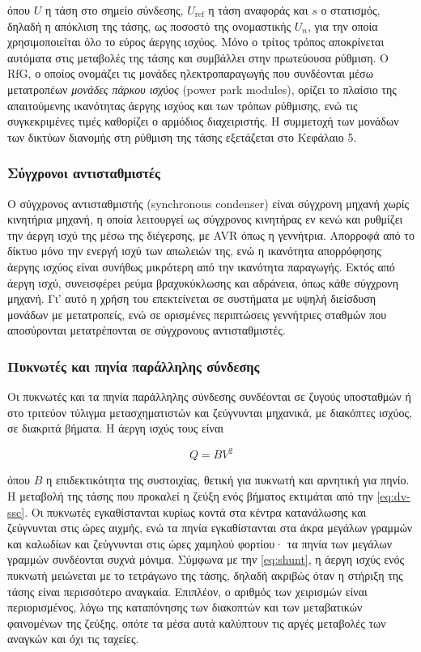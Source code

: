 όπου $U$ η τάση στο σημείο σύνδεσης, $U_{\mathrm{ref}}$ η τάση αναφοράς και $s$ ο στατισμός,
δηλαδή η απόκλιση της τάσης, ως ποσοστό της ονομαστικής $U_n$, για την οποία
χρησιμοποιείται όλο το εύρος άεργης ισχύος. Μόνο ο τρίτος τρόπος αποκρίνεται αυτόματα στις
μεταβολές της τάσης και συμβάλλει στην πρωτεύουσα ρύθμιση. Ο RfG, ο οποίος ονομάζει τις
μονάδες ηλεκτροπαραγωγής που συνδέονται μέσω μετατροπέων \emph{μονάδες πάρκου ισχύος} (power
park modules), ορίζει το πλαίσιο της απαιτούμενης ικανότητας άεργης ισχύος και των τρόπων
ρύθμισης, ενώ τις συγκεκριμένες τιμές καθορίζει ο αρμόδιος διαχειριστής. Η συμμετοχή των μονάδων των δικτύων διανομής στη ρύθμιση
της τάσης εξετάζεται στο Κεφάλαιο 5.

\subsubsection{Σύγχρονοι αντισταθμιστές}

Ο σύγχρονος αντισταθμιστής (synchronous condenser) είναι σύγχρονη μηχανή χωρίς κινητήρια
μηχανή, η οποία λειτουργεί ως σύγχρονος κινητήρας εν κενώ και ρυθμίζει την άεργη ισχύ της
μέσω της διέγερσης, με AVR όπως η γεννήτρια. Απορροφά από το δίκτυο μόνο την ενεργή ισχύ των
απωλειών της, ενώ η ικανότητα απορρόφησης άεργης ισχύος είναι συνήθως μικρότερη από την
ικανότητα παραγωγής. Εκτός από άεργη ισχύ, συνεισφέρει ρεύμα βραχυκύκλωσης και αδράνεια,
όπως κάθε σύγχρονη μηχανή. Γι' αυτό η χρήση του επεκτείνεται σε συστήματα με υψηλή διείσδυση
μονάδων με μετατροπείς, ενώ σε ορισμένες περιπτώσεις γεννήτριες σταθμών που αποσύρονται
μετατρέπονται σε σύγχρονους αντισταθμιστές.

\subsubsection{Πυκνωτές και πηνία παράλληλης σύνδεσης}

Οι πυκνωτές και τα πηνία παράλληλης σύνδεσης συνδέονται σε ζυγούς υποσταθμών ή στο τριτεύον
τύλιγμα μετασχηματιστών και ζεύγνυνται μηχανικά, με διακόπτες ισχύος, σε διακριτά βήματα. Η
άεργη ισχύς τους είναι

\begin{equation}
Q = B V^2
\label{eq:shunt}
\end{equation}

όπου $B$ η επιδεκτικότητα της συστοιχίας, θετική για πυκνωτή και αρνητική για πηνίο. Η
μεταβολή της τάσης που προκαλεί η ζεύξη ενός βήματος εκτιμάται από την \eqref{eq:dv-ssc}. Οι
πυκνωτές εγκαθίστανται κυρίως κοντά στα κέντρα κατανάλωσης και ζεύγνυνται στις ώρες αιχμής,
ενώ τα πηνία εγκαθίστανται στα άκρα μεγάλων γραμμών και καλωδίων και ζεύγνυνται στις ώρες
χαμηλού φορτίου· τα πηνία των μεγάλων γραμμών συνδέονται συχνά μόνιμα. Σύμφωνα με την
\eqref{eq:shunt}, η άεργη ισχύς ενός πυκνωτή μειώνεται με το τετράγωνο της τάσης, δηλαδή
ακριβώς όταν η στήριξη της τάσης είναι περισσότερο αναγκαία. Επιπλέον, ο αριθμός των χειρισμών
είναι περιορισμένος, λόγω της καταπόνησης των διακοπτών και των μεταβατικών φαινομένων της
ζεύξης, οπότε τα μέσα αυτά καλύπτουν τις αργές μεταβολές των αναγκών και όχι τις ταχείες.

